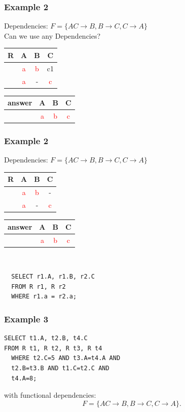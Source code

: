 \documentclass{beamer}
\begin{document}
\begin{frame}
  \frametitle{Example 2}
  Dependencies: $F = \{AC \rightarrow B, B \rightarrow C, C \rightarrow A \}$\\
  Can we use any Dependencies?\\
  \begin{tabular}{ c | c c c}
  R & A & B & C \\
  \hline
  & \textcolor{red}{a}  & \textcolor{red}{b} & c1 \\
  & \textcolor{red}{a}  & - & \textcolor{red}{c} \\
  \end{tabular}
  \begin{tabular}{ c | c c c}
  answer & A & B & C \\
  \hline
   & \textcolor{red}{a}& \textcolor{red}{b}& \textcolor{red}{c}\\
  \end{tabular}
\end{frame}
\begin{frame}[fragile]
  \frametitle{Example 2}
  Dependencies: $F = \{AC \rightarrow B, B \rightarrow C, C \rightarrow A \}$\\
  \begin{tabular}{ c | c c c}
  R & A & B & C \\
  \hline
  & \textcolor{red}{a}  & \textcolor{red}{b} & - \\
  & \textcolor{red}{a}  & - & \textcolor{red}{c} \\
  \end{tabular}
  \begin{tabular}{ c | c c c}
  answer & A & B & C \\
  \hline
   & \textcolor{red}{a}& \textcolor{red}{b}& \textcolor{red}{c}\\
  \end{tabular}
  \hfill \\
\begin{verbatim} 
  SELECT r1.A, r1.B, r2.C
  FROM R r1, R r2
  WHERE r1.a = r2.a;
\end{verbatim}  
\end{frame}

\begin{frame}[fragile]
  \frametitle{Example 3}
  \begin{verbatim}
SELECT t1.A, t2.B, t4.C
FROM R t1, R t2, R t3, R t4
  WHERE t2.C=5 AND t3.A=t4.A AND
  t2.B=t3.B AND t1.C=t2.C AND
  t4.A=8;
  \end{verbatim}
  
  with functional dependencies:
  $$
  F=\{AC\rightarrow B, B\rightarrow C, C \rightarrow A\}.
  $$
\end{frame}
\end{document}
